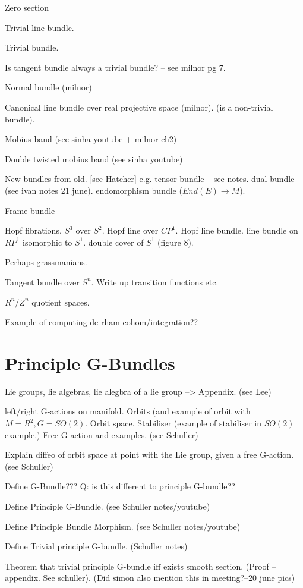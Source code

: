\documentclass[a4paper]{article}
\theoremstyle{definition} \newtheorem*{definition}{Definition}
\theoremstyle{definition} \newtheorem*{definitions}{Definitions}
\theoremstyle{plain} \newtheorem{theorem}{Theorem}[section]
\theoremstyle{plain} \newtheorem{proposition}[theorem]{Proposition}
\theoremstyle{plain} \newtheorem{corollary}[theorem]{Corollary}
\theoremstyle{plain} \newtheorem{lemma}[theorem]{Lemma}
\theoremstyle{plain} \newtheorem{example}[theorem]{Example}
\begin{document}
Zero section

Trivial line-bundle.

Trivial bundle.

Is tangent bundle always a trivial bundle? -- see milnor pg 7.

Normal bundle (milnor)

Canonical line bundle over real projective space (milnor). (is a non-trivial bundle).

Mobius band (see sinha youtube + milnor ch2)

Double twisted mobius band (see sinha youtube)

New bundles from old. [see Hatcher]
e.g. tensor bundle -- see notes.
dual bundle (see ivan notes 21 june).
endomorphism bundle ($End(E)\to M$).

Frame bundle

Hopf fibrations. $S^3$ over $S^2$. Hopf line over $CP^1$. Hopf line bundle. line bundle on $RP^1$ isomorphic to $S^1$. double cover of $S^1$ (figure 8). 

Perhaps grassmanians.

Tangent bundle over $S^n$. Write up transition functions etc.

$R^n/Z^n$ quotient spaces. 

Example of computing de rham cohom/integration??

\section{Principle G-Bundles}

Lie groups, lie algebras, lie alegbra of a lie group --> Appendix. (see Lee)

left/right G-actions on manifold. Orbits (and example of orbit with $M=R^2, G=SO(2)$. Orbit space. Stabiliser (example of stabiliser in $SO(2)$ example.)
Free G-action and examples. (see Schuller)

Explain diffeo of orbit space at point with the Lie group, given a free G-action. (see Schuller)

Define G-Bundle??? Q: is this different to principle G-bundle??

Define Principle G-Bundle. (see Schuller notes/youtube)

Define Principle Bundle Morphism. (see Schuller notes/youtube)

Define Trivial principle G-bundle. (Schuller notes)

Theorem that trivial principle G-bundle iff exists smooth section. (Proof -- appendix. See schuller).  (Did simon also mention this in meeting?--20 june pics)
\end{document}
